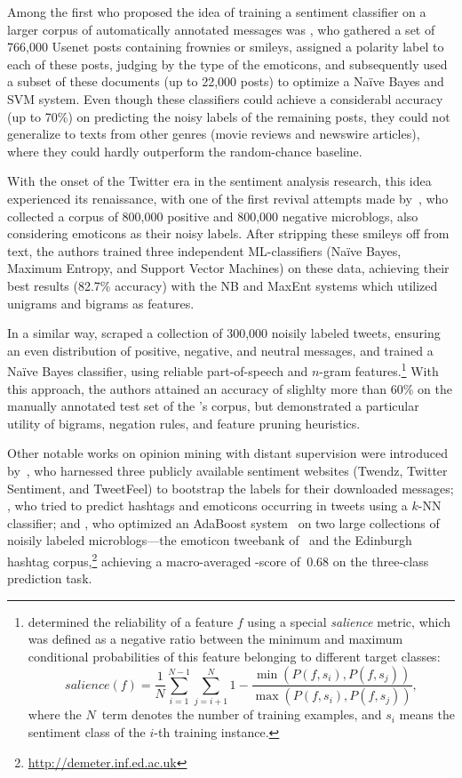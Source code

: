 Among the first who proposed the idea of training a sentiment
classifier on a larger corpus of automatically annotated messages was
\citet{Read:05}, who gathered a set of 766,000 Usenet posts containing
frownies or smileys, assigned a polarity label to each of these posts,
judging by the type of the emoticons, and subsequently used a subset
of these documents (up to 22,000 posts) to optimize a Na{\"i}ve Bayes
and SVM system.  Even though these classifiers could achieve a
considerabl accuracy (up to 70\%) on predicting the noisy labels of
the remaining posts, they could not generalize to texts from other
genres (movie reviews and newswire articles), where they could hardly
outperform the random-chance baseline.

With the onset of the Twitter era in the sentiment analysis research,
this idea experienced its renaissance, with one of the first revival
attempts made by~\citet{Go:09}, who collected a corpus of 800,000
positive and 800,000 negative microblogs, also considering emoticons
as their noisy labels.  After stripping these smileys off from text,
the authors trained three independent ML-classifiers (Na{\"i}ve Bayes,
Maximum Entropy, and Support Vector Machines) on these data, achieving
their best results (82.7\% accuracy) with the NB and MaxEnt systems
which utilized unigrams and bigrams as features.

In a similar way, \citet{Pak:10} scraped a collection of 300,000
noisily labeled tweets, ensuring an even distribution of positive,
negative, and neutral messages, and trained a Na{\"i}ve Bayes
classifier, using reliable part-of-speech and $n$-gram
features.\footnote{\citet{Pak:10} determined the reliability of a
  feature $f$ using a special \emph{salience} metric, which was
  defined as a negative ratio between the minimum and maximum
  conditional probabilities of this feature belonging to different
  target classes:
  \begin{equation*}
    salience(f) = \frac{1}{N}\sum_{i=1}^{N-1}\sum_{j=i+1}^N 1 - \frac{\min(P(f, s_i), P(f, s_j))}{\max(P(f, s_i), P(f, s_j))},
  \end{equation*}
  where the $N$~term denotes the number of training examples, and
  $s_i$ means the sentiment class of the $i$-th training instance.}
With this approach, the authors attained an accuracy of slighlty more
than 60\% on the manually annotated test set of the
\citeauthor{Go:09}'s corpus, but demonstrated a particular utility of
bigrams, negation rules, and feature pruning heuristics.

Other notable works on opinion mining with distant supervision were
introduced by~\citet{Barbosa:10}, who harnessed three publicly
available sentiment websites (Twendz, Twitter Sentiment, and
TweetFeel) to bootstrap the labels for their downloaded messages;
\citet{Davidov:10}, who tried to predict hashtags and emoticons
occurring in tweets using a $k$-NN classifier; and
\citet{Kouloumpis:11}, who optimized an AdaBoost
system~\cite{Schapire:00} on two large collections of noisily labeled
microblogs---the emoticon tweebank of~\citet{Go:09} and the Edinburgh
hashtag corpus,\footnote{\url{http://demeter.inf.ed.ac.uk}} achieving
a macro-averaged \F-score of~0.68 on the three-class prediction task.


